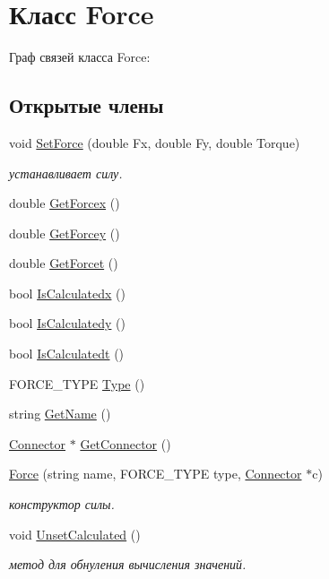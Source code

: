 \hypertarget{class_force}{
\section{Класс Force}
\label{class_force}
}


Граф связей класса Force:
\subsection*{Открытые члены}
\begin{DoxyCompactItemize}
\item 
void \hyperlink{class_force_a4406980b442fc6e0c9ba5269c1ceebdc}{SetForce} (double Fx, double Fy, double Torque)
\begin{DoxyCompactList}\small\item\em устанавливает силу. \item\end{DoxyCompactList}\item 
double \hyperlink{class_force_af9871872f602a852a9f97dbdc2b519e8}{GetForcex} ()
\item 
double \hyperlink{class_force_a4a618734ab7447127d1aea4f82ed8c3f}{GetForcey} ()
\item 
double \hyperlink{class_force_a587e479f76a4358438473b93bfa8e410}{GetForcet} ()
\item 
bool \hyperlink{class_force_abe8c0e0a00ceead9c635232fbec9fa94}{IsCalculatedx} ()
\item 
bool \hyperlink{class_force_a1d795809674b94a256bb28fc69ff1954}{IsCalculatedy} ()
\item 
bool \hyperlink{class_force_a0b7ae87846aacc79ba5f038ebdc6bec9}{IsCalculatedt} ()
\item 
FORCE\_\-TYPE \hyperlink{class_force_a052dfbe05633ac64ba3fede80b434e8e}{Type} ()
\item 
string \hyperlink{class_force_a6c0cfd770e849a8964121220b87c238c}{GetName} ()
\item 
\hyperlink{struct_connector}{Connector} $\ast$ \hyperlink{class_force_a48f0da53a2fc32a45f75131469ee3fd0}{GetConnector} ()
\item 
\hyperlink{class_force_a0ff81da9af3b8b5e08e10a66174bea06}{Force} (string name, FORCE\_\-TYPE type, \hyperlink{struct_connector}{Connector} $\ast$c)
\begin{DoxyCompactList}\small\item\em конструктор силы. \item\end{DoxyCompactList}\item 
\hypertarget{class_force_af7e8d6671f0861e28593fd9d7fbb459a}{
void \hyperlink{class_force_af7e8d6671f0861e28593fd9d7fbb459a}{UnsetCalculated} ()}
\label{class_force_af7e8d6671f0861e28593fd9d7fbb459a}

\begin{DoxyCompactList}\small\item\em метод для обнуления вычисления значений. \item\end{DoxyCompactList}\end{DoxyCompactItemize}
